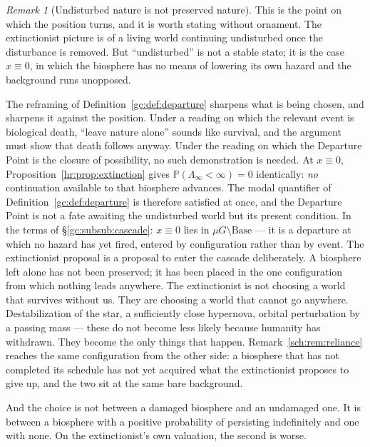 \documentclass[11pt]{article}
\numberwithin{equation}{section}
\theoremstyle{plain}
\theoremstyle{definition}
\theoremstyle{remark}
\newtheorem{remark}[theorem]{Remark}
\newcommand{\PP}{\mathbb{P}}
\begin{document}
\begin{remark}[Undisturbed nature is not preserved nature]
\label{hr:rem:undisturbed}
This is the point on which the position turns, and it is worth stating
without ornament. The extinctionist picture is of a living world
continuing undisturbed once the disturbance is removed. But
``undisturbed'' is not a stable state; it is the case $x\equiv0$, in
which the biosphere has no means of lowering its own hazard and the
background runs unopposed.

The reframing of Definition~\ref{gc:def:departure} sharpens what is
being chosen, and sharpens it against the position. Under a reading on
which the relevant event is biological death, ``leave nature alone''
sounds like survival, and the argument must show that death follows
anyway. Under the reading on which the Departure Point is the closure of
possibility, no such demonstration is needed. At $x\equiv0$,
Proposition~\ref{hr:prop:extinction} gives
$\PP(\Lambda_\infty<\infty)=0$ identically: \emph{no} continuation
available to that biosphere advances. The modal quantifier of
Definition~\ref{gc:def:departure} is therefore satisfied at once, and
the Departure Point is not a fate awaiting the undisturbed world but
its present condition. In the terms of
\S\ref{gc:subsub:cascade}: $x\equiv0$ lies in
$\mu G\setminus\mathrm{Base}$ --- it is a departure at which no hazard
has yet fired, entered by configuration rather than by event. The
extinctionist proposal is a proposal to enter the cascade
deliberately. A biosphere left alone has not been preserved;
it has been placed in the one configuration from which nothing
leads anywhere. The extinctionist is not choosing a world that
survives without us. They are choosing a world that cannot go
anywhere. Destabilization of the star, a sufficiently
close hypernova, orbital perturbation by a passing mass --- these do not
become less likely because humanity has withdrawn. They become the only
things that happen. Remark~\ref{sch:rem:reliance} reaches the same
configuration from the other side: a biosphere that has not completed its
schedule has not yet acquired what the extinctionist proposes to give up,
and the two sit at the same bare background.

And the choice is not between a damaged biosphere and an undamaged one.
It is between a biosphere with a positive probability of persisting
indefinitely and one with none. On the extinctionist's own valuation,
the second is worse.
\end{remark}
\end{document}
